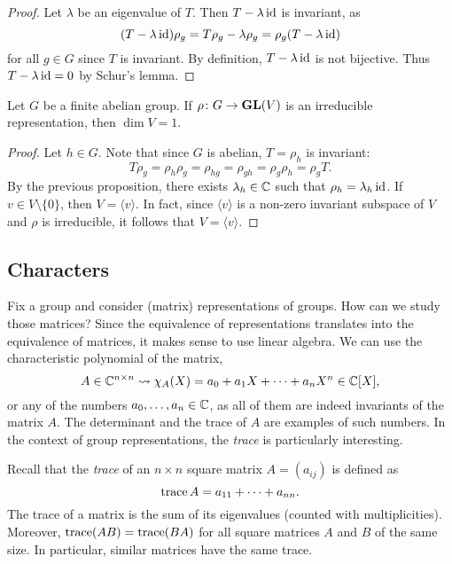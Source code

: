 \begin{proof}
    Let $\lambda$ be an eigenvalue of $T$. Then $T-\lambda\operatorname{id}$ is invariant, as 
    \[
    (T-\lambda\operatorname{id})\rho_g=T\rho_g-\lambda\rho_g=\rho_g(T-\lambda\operatorname{id})
    \]
    for all $g\in G$ since $T$ is invariant. By definition, 
    $T-\lambda\operatorname{id}$ is not bijective. Thus $T-\lambda\operatorname{id}=0$ by Schur's lemma.
\end{proof}

\begin{proposition}
    Let $G$ be a finite abelian group. 
    If $\rho\colon G\to\mathbf{GL}(V)$ is an irreducible representation, then
    $\dim V=1$. 
\end{proposition}

\begin{proof}
    Let $h\in G$. Note that since $G$ is abelian, $T=\rho_h$ is invariant:
    \[
    T\rho_g=\rho_h\rho_g=\rho_{hg}=\rho_{gh}=\rho_g\rho_h=\rho_gT.
    \]
    By the previous proposition, 
    there exists $\lambda_h\in\mathbb{C}$ such that $\rho_h=\lambda_h\operatorname{id}$. If $v\in V\setminus\{0\}$, 
    then $V=\langle v\rangle$. In fact, since 
    $\langle v\rangle$ is a non-zero invariant subspace of $V$ and $\rho$ is irreducible, 
    it follows that $V=\langle v\rangle$. 
\end{proof}

\subsection{Characters}

Fix a group and consider (matrix) representations of groups. How can we study those matrices? Since 
the equivalence of representations translates into the equivalence of matrices, 
it makes sense to use linear algebra. We can use 
the characteristic polynomial of the matrix, 
\[
A\in\mathbb{C}^{n\times n}\rightsquigarrow \chi_A(X)=a_0+a_1X+\cdots+a_nX^n\in \mathbb{C}[X], 
\]
or any of the numbers $a_0,\dots,a_n\in\mathbb{C}$, as all of them are indeed invariants of the matrix $A$.
The determinant and the trace of $A$ are examples of such numbers. In the context of group representations,  
the \emph{trace} is particularly interesting. 

Recall that the \emph{trace} of an $n\times n$ square matrix $A=(a_{ij})$ is defined 
as 
\[
\operatorname{trace} A=a_{11}+\cdots+a_{nn}.
\]
The trace of a matrix is the sum of its eigenvalues (counted with multiplicities). Moreover, $\operatorname{trace}(AB) = \operatorname{trace}(BA)$ for all square matrices $A$ and $B$ of the same size. In particular, similar matrices have the same trace.

